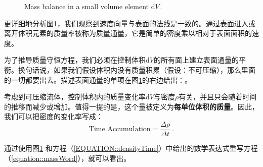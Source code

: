 \documentclass[MathematicsNumericsDerivationsAndOpenFOAM.tex]{subfiles}
\begin{document}
\begin{figure}[!b]
\caption{Mass balance in a small volume element d$V$.}
\label{figure::massFigure}
\end{figure}
%
%
%
%
	更详细地分析图\ref{figure::massFigure}，我们观察到速度向量与表面的法线是一致的。通过表面进入或离开体积元素的质量率被称为质量通量，它是简单的密度乘以相对于表面面积的速度。


	为了推导质量守恒方程，我们必须在控制体积d$V$的所有面上建立表面通量的平衡。换句话说，如果我们假设体积内没有质量积累（假设：不可压缩），那么里面的一切都要出去。描述表面通量的单项在图\ref{figure::massFigure}的右边给出：。

 考虑到可压缩流体，控制体积内的质量变化率d$V$与密度$\rho$有关，并且只会随着时间的推移而减少或增加。值得一提的是，这个量被定义为\textbf{每单位体积的质量}。因此，我们可以把密度的变化率写成：
%
%
\begin{equation}
 \text{Time Accumulation} = \frac{\Delta \rho}{\Delta t}~.
 \label{EQUATION::densityTime}
\end{equation}
%
%

	通过使用图\ref{figure::massFigure} 和方程（\ref{EQUATION::densityTime}）中给出的数学表达式重写方程（\ref{equation::massWord}），就可以看出。
\end{document}
